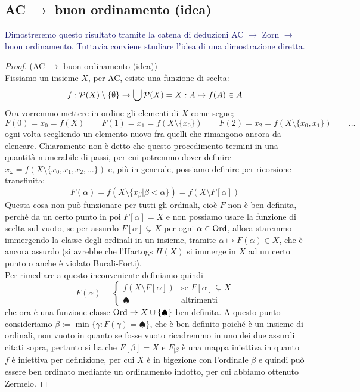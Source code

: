\subsection{\texorpdfstring{AC $\rightarrow$ buon ordinamento (idea)}{AC implica buon ordinamento (idea)}}
\textcolor{MidnightBlue}{Dimostreremo questo risultato tramite la catena di deduzioni AC $\rightarrow$ Zorn $\rightarrow$ buon ordinamento. Tuttavia conviene studiare l'idea di una dimostrazione diretta.}

\begin{proof}
	(AC $\rightarrow$ buon ordinamento (idea))\\
	Fissiamo un insieme $X$, per \hyperref[ax9]{AC}, esiste una funzione di scelta:
	\[ f : \mathcal{P}(X) \setminus\{\emptyset\} \rightarrow \bigcup \mathcal{P}(X) = X : A \mapsto f(A) \in A
		\]
	Ora vorremmo mettere in ordine gli elementi di $X$ come segue;
	\[ F(0) = x_0 = f(X) \qquad F(1) = x_1 = f(X \setminus \{x_0\}) \qquad F(2) = x_2 = f(X \setminus \{x_0,x_1\}) \qquad\ldots
		\]
	ogni volta scegliendo un elemento nuovo fra quelli che rimangono ancora da elencare. Chiaramente non è detto che questo procedimento termini
	in una quantità numerabile di passi, per cui potremmo dover definire $x_\omega = f(X\setminus\{x_0,x_1,x_2,\ldots\})$ e, più in generale, possiamo definire per ricorsione transfinita:
	\[ F(\alpha) = f(X \setminus\{x_\beta | \beta < \alpha\}) = f(X \setminus F[\alpha])
		\]
	Questa cosa non può funzionare per tutti gli ordinali, cioè $F$ non è ben definita, perché da un certo punto in poi $F[\alpha] = X$ e non possiamo usare la funzione di scelta sul vuoto, se per assurdo $F[\alpha] \subsetneq X$ per ogni $\alpha \in \operatorname{Ord}$, allora staremmo immergendo la classe degli ordinali in un insieme, tramite $\alpha \mapsto F(\alpha) \in X$,
	che è ancora assurdo (si avrebbe che l'Hartogs $H(X)$ si immerge in $X$ ad un certo punto o anche è violato Burali-Forti).\\
	Per rimediare a questo inconveniente definiamo quindi
	\[ F(\alpha) = \begin{cases}
		f(X \setminus F[\alpha]) &\text{se $F[\alpha] \subsetneq X$} \\
		\spadesuit &\text{altrimenti}
	\end{cases}
		\] 
	che ora è una funzione classe $\operatorname{Ord} \to X \cup \{\spadesuit\}$ ben definita. A questo punto consideriamo $\beta := \min\{\gamma : F(\gamma) = \spadesuit\}$, che è ben definito poiché è un insieme di ordinali, non vuoto in 
	quanto se fosse vuoto ricadremmo in uno dei due assurdi citati sopra, pertanto si ha che $F[\beta] = X$ e $F_{|\beta}$ è una mappa iniettiva in quanto $f$ è iniettiva per definizione, per cui $X$ è in bigezione con l'ordinale $\beta$
	e quindi può essere ben ordinato mediante un ordinamento indotto, per cui abbiamo ottenuto Zermelo.
\end{proof}

